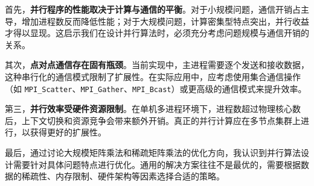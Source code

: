 \documentclass[UTF8,a4paper,12pt]{ctexart}
\begin{document}
首先，\textbf{并行程序的性能取决于计算与通信的平衡}。对于小规模问题，通信开销占主导，增加进程数反而降低性能；对于大规模问题，计算密集型特点突出，并行收益才得以显现。这启示我们在设计并行算法时，必须充分考虑问题规模与通信开销的关系。

其次，\textbf{点对点通信存在固有瓶颈}。当前实现中，主进程需要逐个发送和接收数据，这种串行化的通信模式限制了扩展性。在实际应用中，应考虑使用集合通信操作（如 \texttt{MPI\_Scatter}、\texttt{MPI\_Gather}、\texttt{MPI\_Bcast}）或更高级的通信模式来提升效率。

第三，\textbf{并行效率受硬件资源限制}。在单机多进程环境下，进程数超过物理核心数后，上下文切换和资源竞争会带来额外开销。真正的并行计算应在多节点集群上进行，以获得更好的扩展性。

最后，通过讨论大规模矩阵乘法和稀疏矩阵乘法的优化方向，我认识到并行算法设计需要针对具体问题特点进行优化。通用的解决方案往往不是最优的，需要根据数据的稀疏性、内存限制、硬件架构等因素选择合适的策略。
\end{document}
